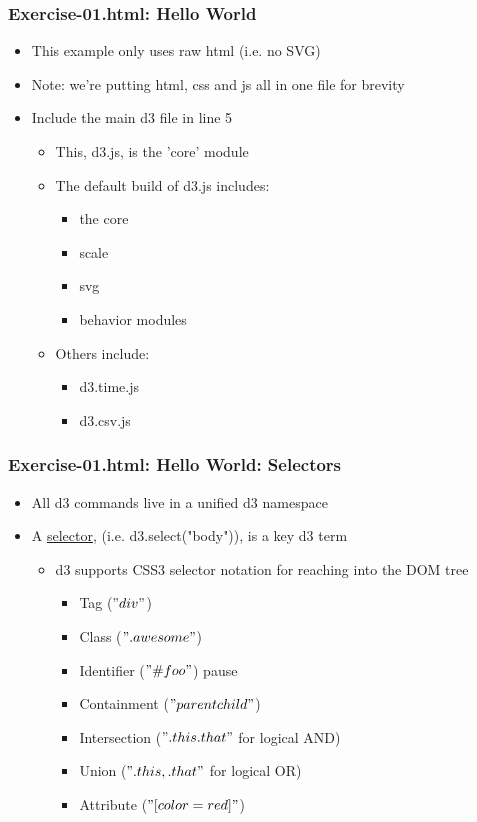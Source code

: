 \documentclass{beamer}
\begin{document}
\begin{frame}
    \frametitle{Exercise-01.html: Hello World}
    \begin{itemize}
    \item This example only uses raw html (i.e. no SVG)
    \item Note: we're putting html, css and js all in one file for brevity
    \item Include the main d3 file in line 5
        \begin{itemize}
        \item This, d3.js, is the 'core' module
        \item The default build of d3.js includes:
            \begin{itemize}
            \item the core
            \item scale
            \item svg 
            \item behavior modules
            \end{itemize}
        \item Others include:
            \begin{itemize}
            \item d3.time.js
            \item d3.csv.js
            \end{itemize}
        \end{itemize}
    \end{itemize}
\end{frame}


\begin{frame}
    \frametitle{Exercise-01.html: Hello World: Selectors}
    \begin{itemize}
    \item All d3 commands live in a unified d3 namespace
    \item A \underline{selector}, (i.e. d3.select("body")), is a key d3 term
        \begin{itemize}
        \item d3 supports CSS3 selector notation for reaching into the DOM tree
            \begin{itemize}
            \item Tag ($"div"$)
            \item Class ($".awesome"$)
            \item Identifier ($"\#foo"$)
pause
            \item Containment ($"parent child"$)
            \item Intersection ($".this.that"$ for logical AND) 
            \item Union ($".this, .that"$ for logical OR)
            \item Attribute ($"[color=red]"$)
            \end{itemize}
        \end{itemize}
    \end{itemize}
\end{frame}
\end{document}
